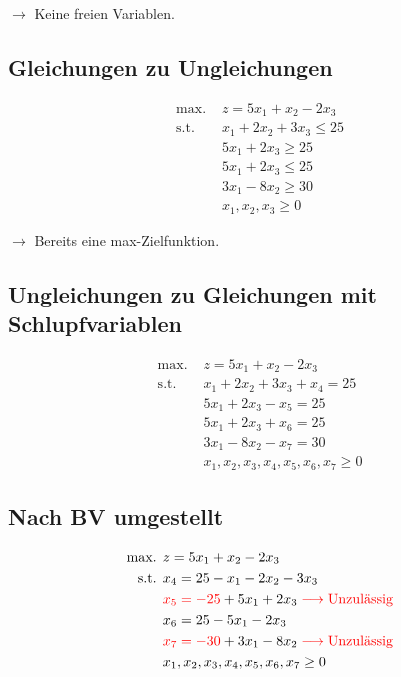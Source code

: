 \documentclass[a4paper,11pt]{article}
\begin{document}
$\to$ Keine freien Variablen. \\

\subsection*{Gleichungen zu Ungleichungen}
\begin{align*}
\text{max. } & z = 5x_1 + x_2 - 2x_3 \\
\text{s.t. } & x_1 + 2x_2 + 3x_3 \le 25 \\
& 5x_1 + 2x_3 \ge 25 \\
& 5x_1 + 2x_3 \le 25 \\
& 3x_1 - 8x_2 \ge 30 \\
& x_1, x_2, x_3 \ge 0
\end{align*}

$\to$ Bereits eine max-Zielfunktion. \\

\subsection*{Ungleichungen zu Gleichungen mit Schlupfvariablen}
\begin{align*}
\text{max. } & z = 5x_1 + x_2 - 2x_3 \\
\text{s.t. } & x_1 + 2x_2 + 3x_3 + x_4 = 25 \\
& 5x_1 + 2x_3 - x_5 = 25 \\
& 5x_1 + 2x_3 + x_6 = 25 \\
& 3x_1 - 8x_2 - x_7 = 30 \\
& x_1, x_2, x_3, x_4, x_5, x_6, x_7 \ge 0
\end{align*}

\subsection*{Nach BV umgestellt}
\begin{align*}
\text{max. } & z = 5x_1 + x_2 - 2x_3 \\
\text{s.t. } & x_4 = 25 - x_1 - 2x_2 - 3x_3 \\
& {\color{red} x_5 = -25} + 5x_1 + 2x_3 \color{red} \longrightarrow \text{Unzulässig} \\
& x_6 = 25 - 5x_1 - 2x_3 \\
& {\color{red} x_7 = -30} + 3x_1 - 8x_2 \color{red} \longrightarrow \text{Unzulässig} \\
& x_1, x_2, x_3, x_4, x_5, x_6, x_7 \ge 0
\end{align*}
\end{document}
